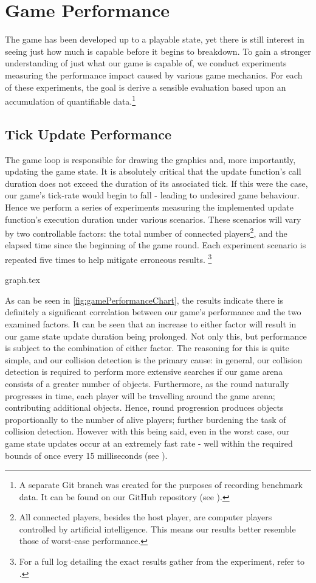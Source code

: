 \documentclass{standalone}
\begin{document}
	\section{Game Performance}
		The game has been developed up to a playable state, yet there is still interest in seeing just how much is capable before it begins to breakdown. To gain a stronger understanding of just what our game is capable of, we conduct experiments measuring the performance impact caused by various game mechanics. For each of these experiments, the goal is derive a sensible evaluation based upon an accumulation of quantifiable data.\footnote{A separate Git branch was created for the purposes of recording benchmark data. It can be found on our GitHub repository (see ).}

		\subsection{Tick Update Performance} \label{sec:tickUpdatePerformance}
			The game loop is responsible for drawing the graphics and, more importantly, updating the game state. It is absolutely critical that the update function's call duration does not exceed the duration of its associated tick. If this were the case, our game's tick-rate would begin to fall - leading to undesired game behaviour. Hence we perform a series of experiments measuring the implemented update function's execution duration under various scenarios. These scenarios will vary by two controllable factors: the total number of connected players\footnote{All connected players, besides the host player, are computer players controlled by artificial intelligence. This means our results better resemble those of worst-case performance.}, and the elapsed time since the beginning of the game round. Each experiment scenario is repeated five times to help mitigate erroneous results. \footnote{For a full log detailing the exact results gather from the experiment, refer to .}

			\thispagestyle{empty}
				{graph.tex}

			As can be seen in \autoref{fig:gamePerformanceChart}, the results indicate there is definitely a significant correlation between our game's performance and the two examined factors. It can be seen that an increase to either factor will result in our game state update duration being prolonged. Not only this, but performance is subject to the combination of either factor. The reasoning for this is quite simple, and our collision detection is the primary cause: in general, our collision detection is required to perform more extensive searches if our game arena consists of a greater number of objects. Furthermore, as the round naturally progresses in time, each player will be travelling around the game arena; contributing additional objects. Hence, round progression produces objects proportionally to the number of alive players; further burdening the task of collision detection. However with this being said, even in the worst case, our game state updates occur at an extremely fast rate - well within the required bounds of once every 15 milliseconds (see ).
\end{document}
